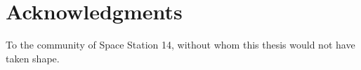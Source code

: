 
\section*{Acknowledgments}

To the community of Space Station 14, without whom this thesis would not have taken shape.